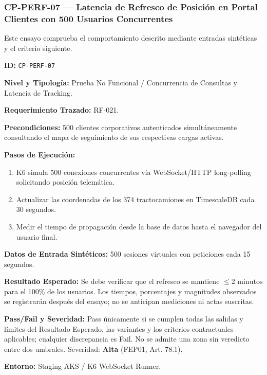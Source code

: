 \subsubsection*{CP-PERF-07 — Latencia de Refresco de Posición en Portal Clientes con 500 Usuarios Concurrentes}\label{sec:9-cp-perf-07}
Este ensayo comprueba el comportamiento descrito mediante entradas sintéticas y el criterio siguiente.

\par\noindent\textbf{ID:} \texttt{C\allowbreak{}P\allowbreak{}-\allowbreak{}P\allowbreak{}E\allowbreak{}R\allowbreak{}F\allowbreak{}-\allowbreak{}0\allowbreak{}7\allowbreak{}}\par
\par\noindent\textbf{Nivel y Tipología:} Prueba No Funcional / Concurrencia de Consultas y Latencia de Tracking.\par
\par\noindent\textbf{Requerimiento Trazado:} RF-021.\par
\par\noindent\textbf{Precondiciones:} 500 clientes corporativos autenticados simultáneamente consultando el mapa de seguimiento de sus respectivas cargas activas.\par
\par\noindent\textbf{Pasos de Ejecución:} \par
\begin{enumerate}
\item K6 simula 500 conexiones concurrentes vía WebSocket/HTTP long-polling solicitando posición telemática.
\item Actualizar las coordenadas de los 374 tractocamiones en TimescaleDB cada 30 segundos.
\item Medir el tiempo de propagación desde la base de datos hasta el navegador del usuario final.
\end{enumerate}
\par\noindent\textbf{Datos de Entrada Sintéticos:} 500 sesiones virtuales con peticiones cada 15 segundos.\par
\par\noindent\textbf{Resultado Esperado:} Se debe verificar que el refresco se mantiene \(\le 2\text{ minutos}\) para el 100\% de los usuarios. Los tiempos, porcentajes y magnitudes observados se registrarán después del ensayo; no se anticipan mediciones ni actas suscritas.\par
\par\noindent\textbf{Pass/Fail y Severidad:} Pass únicamente si se cumplen todas las salidas y límites del Resultado Esperado, las variantes y los criterios contractuales aplicables; cualquier discrepancia es Fail. No se admite una zona sin veredicto entre dos umbrales. Severidad: \textbf{Alta} (FEP01, Art. 78.1).\par
\par\noindent\textbf{Entorno:} Staging AKS / K6 WebSocket Runner.\par






